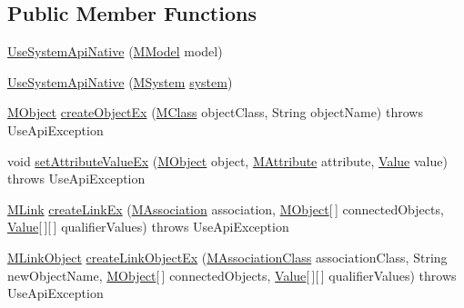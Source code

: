 \subsection*{Public Member Functions}
\begin{DoxyCompactItemize}
\item 
\hyperlink{classorg_1_1tzi_1_1use_1_1api_1_1impl_1_1_use_system_api_native_a3ac1ec7b311e9802a5c7e8a91e5b4735}{Use\-System\-Api\-Native} (\hyperlink{classorg_1_1tzi_1_1use_1_1uml_1_1mm_1_1_m_model}{M\-Model} model)
\item 
\hyperlink{classorg_1_1tzi_1_1use_1_1api_1_1impl_1_1_use_system_api_native_a347bf622a23fddcf4ec45ad29fe1683d}{Use\-System\-Api\-Native} (\hyperlink{classorg_1_1tzi_1_1use_1_1uml_1_1sys_1_1_m_system}{M\-System} \hyperlink{classorg_1_1tzi_1_1use_1_1api_1_1_use_system_api_aabe59f3d91d8ec4b257ec0fce2339a28}{system})
\item 
\hyperlink{interfaceorg_1_1tzi_1_1use_1_1uml_1_1sys_1_1_m_object}{M\-Object} \hyperlink{classorg_1_1tzi_1_1use_1_1api_1_1impl_1_1_use_system_api_native_ae17106e87eaf735c15039da6325a63d7}{create\-Object\-Ex} (\hyperlink{interfaceorg_1_1tzi_1_1use_1_1uml_1_1mm_1_1_m_class}{M\-Class} object\-Class, String object\-Name)  throws Use\-Api\-Exception 
\item 
void \hyperlink{classorg_1_1tzi_1_1use_1_1api_1_1impl_1_1_use_system_api_native_a5cba272e92c9e7177943aa93c34a3902}{set\-Attribute\-Value\-Ex} (\hyperlink{interfaceorg_1_1tzi_1_1use_1_1uml_1_1sys_1_1_m_object}{M\-Object} object, \hyperlink{classorg_1_1tzi_1_1use_1_1uml_1_1mm_1_1_m_attribute}{M\-Attribute} attribute, \hyperlink{classorg_1_1tzi_1_1use_1_1uml_1_1ocl_1_1value_1_1_value}{Value} value)  throws Use\-Api\-Exception 
\item 
\hyperlink{interfaceorg_1_1tzi_1_1use_1_1uml_1_1sys_1_1_m_link}{M\-Link} \hyperlink{classorg_1_1tzi_1_1use_1_1api_1_1impl_1_1_use_system_api_native_a5217a3af2894885f27d8f587ef15b103}{create\-Link\-Ex} (\hyperlink{interfaceorg_1_1tzi_1_1use_1_1uml_1_1mm_1_1_m_association}{M\-Association} association, \hyperlink{interfaceorg_1_1tzi_1_1use_1_1uml_1_1sys_1_1_m_object}{M\-Object}\mbox{[}$\,$\mbox{]} connected\-Objects, \hyperlink{classorg_1_1tzi_1_1use_1_1uml_1_1ocl_1_1value_1_1_value}{Value}\mbox{[}$\,$\mbox{]}\mbox{[}$\,$\mbox{]} qualifier\-Values)  throws Use\-Api\-Exception 
\item 
\hyperlink{interfaceorg_1_1tzi_1_1use_1_1uml_1_1sys_1_1_m_link_object}{M\-Link\-Object} \hyperlink{classorg_1_1tzi_1_1use_1_1api_1_1impl_1_1_use_system_api_native_af9664052aa420beed1aec2bfe368a198}{create\-Link\-Object\-Ex} (\hyperlink{interfaceorg_1_1tzi_1_1use_1_1uml_1_1mm_1_1_m_association_class}{M\-Association\-Class} association\-Class, String new\-Object\-Name, \hyperlink{interfaceorg_1_1tzi_1_1use_1_1uml_1_1sys_1_1_m_object}{M\-Object}\mbox{[}$\,$\mbox{]} connected\-Objects, \hyperlink{classorg_1_1tzi_1_1use_1_1uml_1_1ocl_1_1value_1_1_value}{Value}\mbox{[}$\,$\mbox{]}\mbox{[}$\,$\mbox{]} qualifier\-Values)  throws Use\-Api\-Exception 

\end{DoxyCompactItemize}
